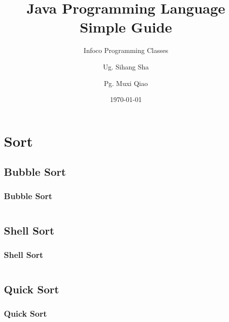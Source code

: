 \documentclass[en, 11pt, xcolor=dvipsnames]{beamer}
\title{Java Programming Language \\ Simple Guide} %
\subtitle{Infoco Programming Classes} %
\author{Ug. Sihang Sha \and Pg. Muxi Qiao} %
\institute{Xiann' Jiaotong Livepool University \\ \smallskip \textit{infoco@xjtlu.edu.cn}} %
\date{\today} %
\begin{document}
\maketitle


\section{Sort}

\subsection{Bubble Sort}
\begin{frame}[fragile]
	\frametitle{Bubble Sort}


	\begin{columns}[c]
		\begin{column}{0.98\textwidth}


		\end{column}
	\end{columns}

\end{frame}

\subsection{Shell Sort}
\begin{frame}[fragile]
	\frametitle{Shell Sort}



	\begin{columns}[c]
		\begin{column}{0.98\textwidth}


		\end{column}
	\end{columns}

\end{frame}

\subsection{Quick Sort}
\begin{frame}[fragile]
	\frametitle{Quick Sort}



	\begin{columns}[c]
		\begin{column}{0.98\textwidth}

		\end{column}
	\end{columns}

\end{frame}
\end{document}
